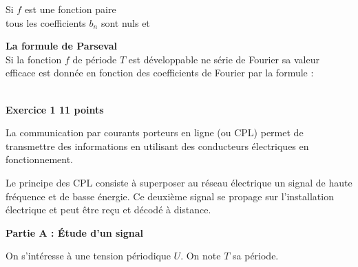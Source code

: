 \documentclass[11pt,a4paper]{article}
\begin{document}
\begin{center}
{\begin{minipage}{17cm}
{Si $f$ est une fonction paire\\ 
tous les coefficients $b_n$ sont nuls et\\ \begin{center}
\end{center} 

\vspace{8 mm}

\textbf{La formule de Parseval}\\
Si la fonction $f$ de période $T$ est développable ne série de Fourier sa valeur efficace est donnée en fonction des coefficients de Fourier par la formule : \\
\begin{center}
\end{center}




\vspace{3 mm}
}

\end{minipage}}
\end{center}

\newpage
\\[2mm]
\textbf{Exercice 1 \hfill 11 points}

\medskip

La communication par courants porteurs en ligne (ou CPL) permet de transmettre des informations en utilisant des conducteurs électriques en fonctionnement.

Le principe des CPL consiste à superposer au réseau électrique un signal de haute fréquence et de basse énergie. Ce deuxième signal se propage sur l'installation électrique et peut être reçu et décodé à distance.

\textbf{Partie A : Étude d'un signal}

\medskip

On s'intéresse à une tension périodique $U$. On note $T$ sa période.

\medskip
\end{document}
